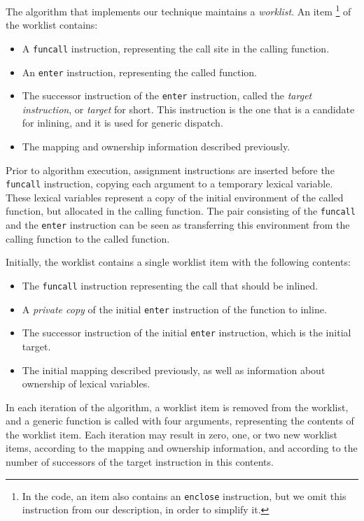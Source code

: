The algorithm that implements our technique maintains a
\emph{worklist}.  An item%
\footnote{In the code, an item also contains an \texttt{enclose}
  instruction, but we omit this instruction from our description, in
  order to simplify it.}
of the worklist contains:

\begin{itemize}
\item A \texttt{funcall} instruction, representing the call site in the
  calling function.
\item An \texttt{enter} instruction, representing the called function.
\item The successor instruction of the \texttt{enter} instruction,
  called the \emph{target instruction}, or \emph{target} for short.
  This instruction is the one that is a candidate for inlining, and it
  is used for generic dispatch.
\item The mapping and ownership information described previously.
\end{itemize}

Prior to algorithm execution, assignment instructions are inserted
before the \texttt{funcall} instruction, copying each argument to a
temporary lexical variable.  These lexical variables represent a copy
of the initial environment of the called function, but allocated in
the calling function.  The pair consisting of the \texttt{funcall} and
the \texttt{enter} instruction can be seen as transferring this
environment from the calling function to the called function.

Initially, the worklist contains a single worklist item with the
following contents:

\begin{itemize}
\item The \texttt{funcall} instruction representing the call that
  should be inlined.
\item A \emph{private copy} of the initial \texttt{enter} instruction
  of the function to inline.
\item The successor instruction of the initial \texttt{enter}
  instruction, which is the initial target.
\item The initial mapping described previously, as well as
  information about ownership of lexical variables.
\end{itemize}

In each iteration of the algorithm, a worklist item is removed from
the worklist, and a generic function is called with four arguments,
representing the contents of the worklist item.  Each iteration may
result in zero, one, or two new worklist items, according to the
mapping and ownership information, and according to the number of
successors of the target instruction in this contents.

